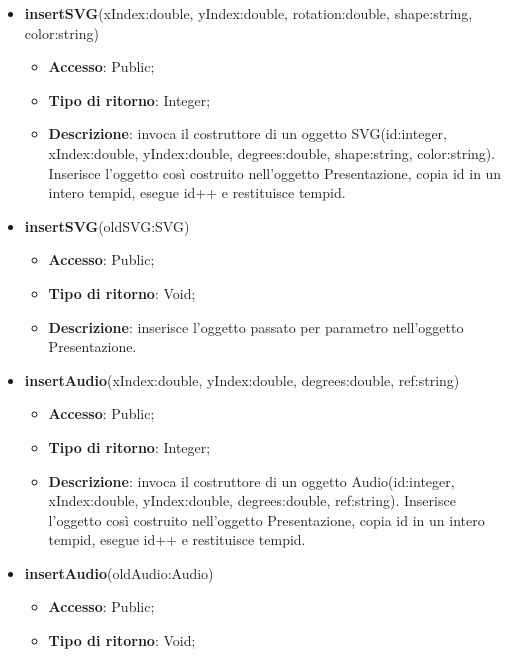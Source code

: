 {{\begin{itemize}
\begin{itemize}
				\item \textbf{Accesso}: Public;
				\item \textbf{Tipo di ritorno}: Void;
				\item \textbf{Descrizione}: inserisce l’oggetto passato per parametro nell’oggetto Presentazione.
			\end{itemize}
			\item \textbf{insertSVG}(xIndex:double, yIndex:double, rotation:double, shape:string, color:string)
			\begin{itemize}
				\item \textbf{Accesso}: Public;
				\item \textbf{Tipo di ritorno}: Integer;
				\item \textbf{Descrizione}: invoca il costruttore di un oggetto SVG(id:integer, xIndex:double, yIndex:double, degrees:double, shape:string, color:string). Inserisce l’oggetto così costruito nell’oggetto Presentazione, copia id in un intero tempid, esegue id++ e restituisce tempid.
			\end{itemize}
			\item \textbf{insertSVG}(oldSVG:SVG)
			\begin{itemize}
				\item \textbf{Accesso}: Public;
				\item \textbf{Tipo di ritorno}: Void;
				\item \textbf{Descrizione}: inserisce l’oggetto passato per parametro nell’oggetto Presentazione.
			\end{itemize}
			\item \textbf{insertAudio}(xIndex:double, yIndex:double, degrees:double, ref:string)
			\begin{itemize}
				\item \textbf{Accesso}: Public;
				\item \textbf{Tipo di ritorno}: Integer;
				\item \textbf{Descrizione}: invoca il costruttore di un oggetto Audio(id:integer, xIndex:double, yIndex:double, degrees:double, ref:string). Inserisce l’oggetto così costruito nell’oggetto Presentazione, copia id in un intero tempid, esegue id++ e restituisce tempid.
			\end{itemize}
			\item \textbf{insertAudio}(oldAudio:Audio)
			\begin{itemize}
				\item \textbf{Accesso}: Public;
				\item \textbf{Tipo di ritorno}: Void;

\end{itemize}
\end{itemize}}}
